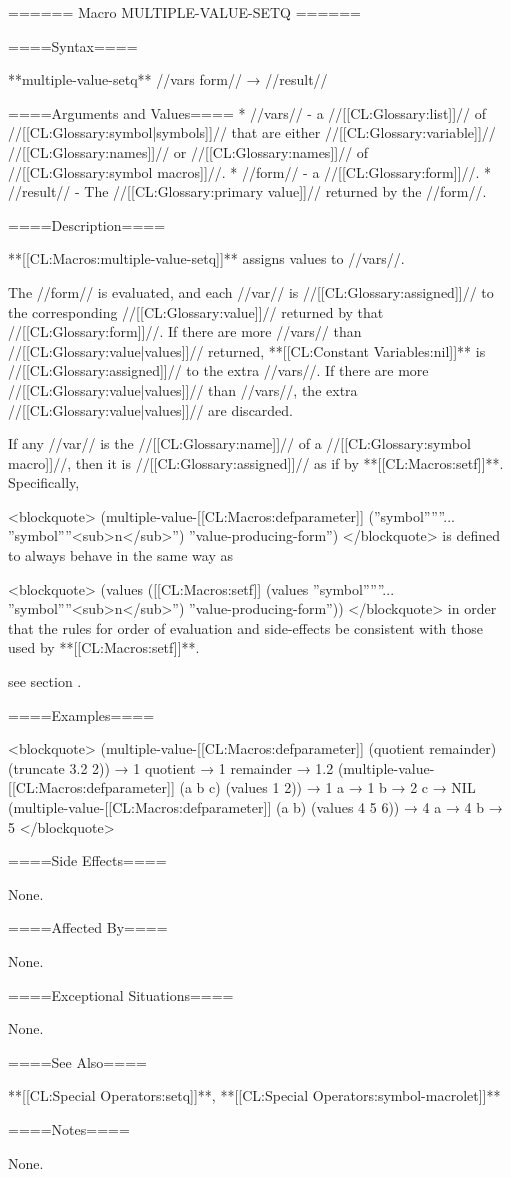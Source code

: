 ====== Macro MULTIPLE-VALUE-SETQ ======

====Syntax====

**multiple-value-setq** //vars form// → //result//

====Arguments and Values====
  * //vars// - a //[[CL:Glossary:list]]// of //[[CL:Glossary:symbol|symbols]]// that are either //[[CL:Glossary:variable]]// //[[CL:Glossary:names]]// or //[[CL:Glossary:names]]// of //[[CL:Glossary:symbol macros]]//.
  * //form// - a //[[CL:Glossary:form]]//.
  * //result// - The //[[CL:Glossary:primary value]]// returned by the //form//.

====Description====

**[[CL:Macros:multiple-value-setq]]** assigns values to //vars//.

The //form// is evaluated, and each //var// is //[[CL:Glossary:assigned]]// to the corresponding //[[CL:Glossary:value]]// returned by that //[[CL:Glossary:form]]//. If there are more //vars// than //[[CL:Glossary:value|values]]// returned, **[[CL:Constant Variables:nil]]** is //[[CL:Glossary:assigned]]// to the extra //vars//. If there are more //[[CL:Glossary:value|values]]// than //vars//, the extra //[[CL:Glossary:value|values]]// are discarded.

If any //var// is the //[[CL:Glossary:name]]// of a //[[CL:Glossary:symbol macro]]//, then it is //[[CL:Glossary:assigned]]// as if by **[[CL:Macros:setf]]**. Specifically,

\begingroup {} \def\subN{''<sub>n</sub>''} <blockquote> (multiple-value-[[CL:Macros:defparameter]] (''symbol''\subOne ... ''symbol''\subN) ''value-producing-form'') </blockquote> is defined to always behave in the same way as

<blockquote> (values ([[CL:Macros:setf]] (values ''symbol''\subOne ... ''symbol''\subN) ''value-producing-form'')) </blockquote> \endgroup in order that the rules for order of evaluation and side-effects be consistent with those used by **[[CL:Macros:setf]]**.

see section {\secref\SETFofVALUES}.

====Examples====

<blockquote> (multiple-value-[[CL:Macros:defparameter]] (quotient remainder) (truncate 3.2 2)) → 1 quotient → 1 remainder → 1.2 (multiple-value-[[CL:Macros:defparameter]] (a b c) (values 1 2)) → 1 a → 1 b → 2 c → NIL (multiple-value-[[CL:Macros:defparameter]] (a b) (values 4 5 6)) → 4 a → 4 b → 5 </blockquote>

====Side Effects====

None.

====Affected By====

None.

====Exceptional Situations====

None.

====See Also====

**[[CL:Special Operators:setq]]**, **[[CL:Special Operators:symbol-macrolet]]**

====Notes====

None.

 
